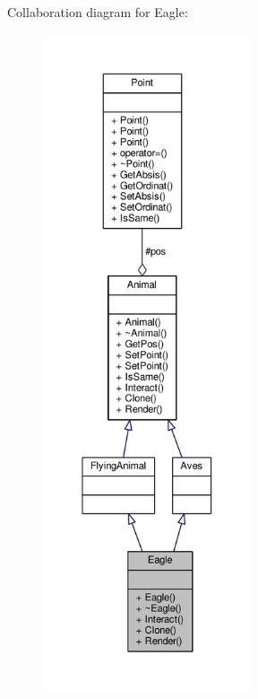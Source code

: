 Collaboration diagram for Eagle\+:
\nopagebreak
\begin{figure}[H]
\begin{center}
\leavevmode
\includegraphics[height=550pt]{classEagle__coll__graph}
\end{center}
\end{figure}
